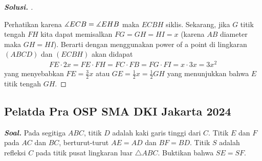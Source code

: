 \documentclass[letterpaper, 13pt]{scrartcl}
\begin{document}
\begin{proof}[\textbf{Solusi. }]
\begin{center}
\begin{tikzpicture}[scale=2.5, dot/.style={circle, fill, inner sep=0.5pt, outer sep=0pt}]
    \end{tikzpicture}
\end{center}

    Perhatikan karena $\measuredangle ECB = \measuredangle EHB$ maka $ECBH$ siklis. Sekarang, jika $G$ titik tengah $FH$ kita dapat memisalkan $FG=GH=HI=x$ (karena $AB$ diameter maka $GH=HI$). Berarti dengan menggunakan power of a point di lingkaran $(ABCD)$ dan $(ECBH)$ akan didapat
    \begin{align*}
        FE \cdot 2x = FE \cdot FH = FC \cdot FB = FG \cdot FI = x \cdot 3x = 3x^2 
    \end{align*}
    yang menyebabkan $FE = \frac{3}{2}x$ atau $GE=\frac{1}{2}x=\frac{1}{2}GH$ yang menunjukkan bahwa $E$ titik tengah $GH$.
\end{proof}

\subsection{Pelatda Pra OSP SMA DKI Jakarta 2024}

\textbf{\textit{Soal. }}Pada segitiga $ABC$, titik $D$ adalah kaki garis tinggi dari $C$. Titik $E$ dan $F$ pada $AC$ dan $BC$, berturut-turut $AE = AD$ dan $BF = BD$. Titik $S$ adalah refleksi $C$ pada titik pusat lingkaran luar $\triangle ABC$. Buktikan bahwa $SE=SF$.
\end{document}
